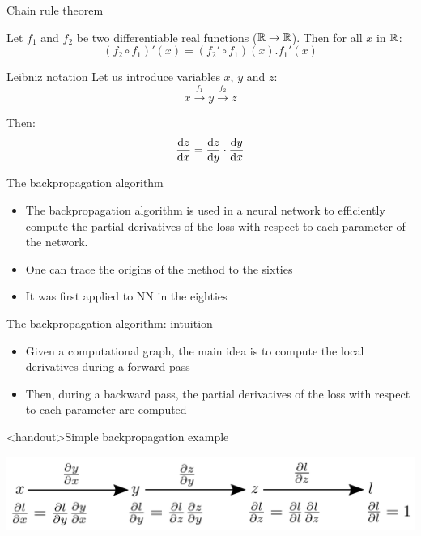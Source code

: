 \documentclass[xcolor=pdftex,dvipsnames,table,mathserif]{beamer}
\begin{document}
\begin{frame}{Chain rule theorem}

  \begin{block}{}
    Let $f_1$ and $f_2$ be two differentiable real functions ($\mathbb{R} \rightarrow \mathbb{R}$). Then for all $x$ in $\mathbb{R}$:
    \[
    (f_2 \circ f_1)'(x) = (f_2'\circ f_1)(x).f_1'(x)
    \]
  \end{block}


  \begin{block}{Leibniz notation}
    Let us introduce variables $x$, $y$ and $z$:
    \[x \xrightarrow{f_1} y \xrightarrow{f_2} z\]

    Then:
    \[\dv{z}{x} = \dv{z}{y} \cdot \dv{y}{x} \]

  \end{block}
  \end{frame}

\begin{frame}{The backpropagation algorithm}

  \begin{itemize}
  \item The backpropagation algorithm is used in a neural network to efficiently compute the partial derivatives of the loss with respect to each parameter of the network.
  \item One can trace the origins of the method to the sixties
  \item It was first applied to NN in the eighties \cite{werbos_applications_1982, lecun_procedure_1985}
  \end{itemize}


\end{frame}


\begin{frame}{The backpropagation algorithm: intuition}

  \begin{itemize}
  \item Given a computational graph, the main idea is to compute the local derivatives during a forward pass
  \item Then, during a backward pass, the partial derivatives of the loss with respect to each parameter are computed
  \end{itemize}


\end{frame}



\begin{frame}<handout>{Simple backpropagation example}

  \includegraphics[width=\textwidth]{bp_simple.png}

\end{frame}
\end{document}
